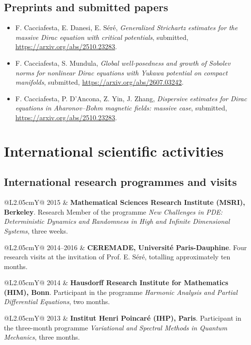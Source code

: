 \documentclass[10pt,a4paper]{article}
\makeatletter
\newcommand{\yearrow}[2]{%
  \begin{tabularx}{\textwidth}{@{}L{2.05cm}Y@{}}
    \textcolor{muted}{#1} & #2
  \end{tabularx}\vspace{1pt}
}
\newcommand{\FC}{{F. Cacciafesta}}
\makeatother
\begin{document}
\subsection{Preprints and submitted papers}
\begin{itemize}
\small
\item \FC, E. Danesi, E. S\'er\'e, \emph{Generalized Strichartz estimates for the massive Dirac equation with critical potentials}, submitted, \url{https://arxiv.org/abs/2510.23283}.
\item \FC, S. Mundula, \emph{Global well-posedness and growth of Sobolev norms for nonlinear Dirac equations with Yukawa potential on compact manifolds}, submitted, \url{https://arxiv.org/abs/2607.03242}.
\item \FC, P. D'Ancona, Z. Yin, J. Zhang, \emph{Dispersive estimates for Dirac equations in Aharonov--Bohm magnetic fields: massive case}, submitted, \url{https://arxiv.org/abs/2510.23283}.

\end{itemize}

\section{International scientific activities}

\subsection{International research programmes and visits}
\yearrow{2015}{\textbf{Mathematical Sciences Research Institute (MSRI), Berkeley}. Research Member of the programme \emph{New Challenges in PDE: Deterministic Dynamics and Randomness in High and Infinite Dimensional Systems}, three weeks.}
\yearrow{2014--2016}{\textbf{CEREMADE, Universit\'e Paris-Dauphine}. Four research visits at the invitation of Prof. E. S\'er\'e, totalling approximately ten months.}
\yearrow{2014}{\textbf{Hausdorff Research Institute for Mathematics (HIM), Bonn}. Participant in the programme \emph{Harmonic Analysis and Partial Differential Equations}, two months.}
\yearrow{2013}{\textbf{Institut Henri Poincar\'e (IHP), Paris}. Participant in the three-month programme \emph{Variational and Spectral Methods in Quantum Mechanics}, three months.}
\end{document}
